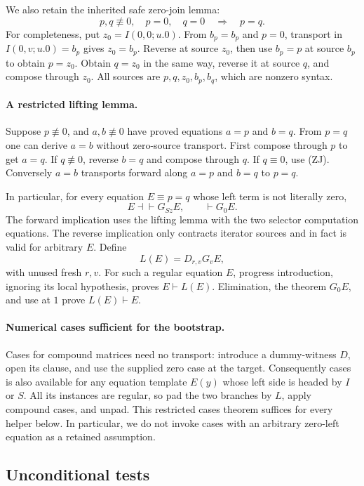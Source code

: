 \documentclass[11pt,letterpaper]{article}
\theoremstyle{definition}\newtheorem{definition}[theorem]{Definition}
\theoremstyle{remark}\newtheorem{remark}[theorem]{Remark}
\begin{document}
We also retain the inherited safe zero-join lemma:
\[
 p,q\not\equiv0,\quad p=0,\quad q=0 \quad\Longrightarrow\quad p=q.
                                                               \tag{ZJ}
\]
For completeness, put $z_0=I(0,0;u.0)$. From $b_p=b_p$ and $p=0$,
transport in $I(0,v;u.0)=b_p$ gives $z_0=b_p$. Reverse at source $z_0$,
then use $b_p=p$ at source $b_p$ to obtain $p=z_0$. Obtain $q=z_0$ in
the same way, reverse it at source $q$, and compose through $z_0$.
All sources are $p,q,z_0,b_p,b_q$, which are nonzero syntax.

\paragraph{A restricted lifting lemma.}
Suppose $p\not\equiv0$, and $a,b\not\equiv0$ have proved equations
$a=p$ and $b=q$. From $p=q$ one can derive $a=b$ without zero-source
transport. First compose through $p$ to get $a=q$. If $q\not\equiv0$,
reverse $b=q$ and compose through $q$. If $q\equiv0$, use (ZJ).
Conversely $a=b$ transports forward along $a=p$ and $b=q$ to $p=q$.

In particular, for every equation $E\equiv p=q$ whose left term is not
literally zero,
\[
     E\dashv\vdash G_{Sz}E,\qquad \vdash G_0E.
\]
The forward implication uses the lifting lemma with the two selector
computation equations. The reverse implication only contracts iterator
sources and in fact is valid for arbitrary $E$. Define
\[
       L(E)=D_{r,v}G_vE,
\]
with unused fresh $r,v$. For such a regular equation $E$, progress
introduction, ignoring its local hypothesis, proves $E\vdash L(E)$.
Elimination, the theorem $G_0E$, and use at $1$ prove $L(E)\vdash E$.

\paragraph{Numerical cases sufficient for the bootstrap.}
Cases for compound matrices need no transport: introduce a dummy-witness
$D$, open its clause, and use the supplied zero case at the target.
Consequently cases is also available for any equation template $E(y)$
whose left side is headed by $I$ or $S$. All its instances are regular,
so pad the two branches by $L$, apply compound cases, and unpad.
This restricted cases theorem suffices for every helper below. In
particular, we do not invoke cases with an arbitrary zero-left equation
as a retained assumption.

\subsection{Unconditional tests}
\end{document}
